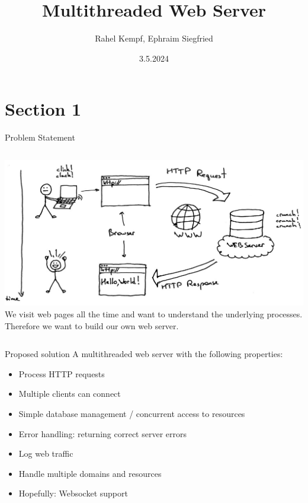 \documentclass[aspectratio=169]{beamer}
\title              {Multithreaded Web Server}
\author             {Rahel Kempf, Ephraim Siegfried}
\institute          {Operating Systems, University of Basel}
\date               {3.5.2024}
\begin{document}
\begin{frame}[t,plain]
\titlepage
\end{frame}


\section{Section 1}	%

\begin{frame}[c]{Problem Statement}
\begin{columns}[c]
            \includegraphics[width=\textwidth]{webserver-comic.jpg}
   We visit web pages all the time and want to understand the underlying processes. Therefore we want to build our own web server.
\end{columns}
\end{frame}


\begin{frame}[c]{Proposed solution}
  A multithreaded web server with the following properties:
  \begin{itemize}
 \item Process HTTP requests
    \item Multiple clients can connect
    \item Simple database management / concurrent access to resources 
    \item Error handling: returning correct server errors
    \item Log web traffic
    \item Handle multiple domains and resources
    \item Hopefully: Websocket support
  \end{itemize}
\end{frame}
\end{document}
